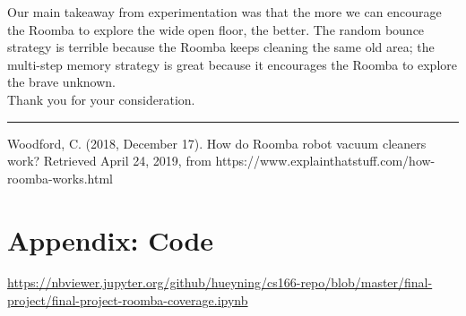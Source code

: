 \documentclass[11pt]{article}
\begin{document}
Our main takeaway from experimentation was that the more we can
encourage the Roomba to explore the wide open floor, the better. The
random bounce strategy is terrible because the Roomba keeps cleaning the
same old area; the multi-step memory strategy is great because it
encourages the Roomba to explore the brave unknown.\\

Thank you for your consideration.

\rule{\textwidth}{0.4pt}

\newpage
\begin{thebibliography}{9}
Woodford, C. (2018, December 17). How do Roomba robot vacuum cleaners
work? Retrieved April 24, 2019, from
https://www.explainthatstuff.com/how-roomba-works.html
\end{thebibliography}

\appendix
\section{Appendix: Code}
\label{appendix:code}
\url{https://nbviewer.jupyter.org/github/hueyning/cs166-repo/blob/master/final-project/final-project-roomba-coverage.ipynb}


    
    
    
    
\end{document}
